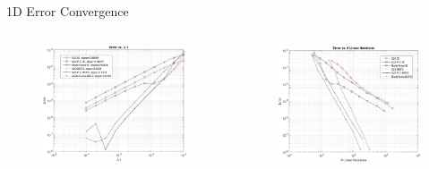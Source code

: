 \documentclass[8pt]{beamer}
\begin{document}
\begin{frame}{1D Error Convergence}

\begin{columns}
\begin{figure}[h]
\includegraphics[width=\linewidth]{figures/1D_dt.jpg}
\end{figure}
\begin{figure}[h]
\includegraphics[width=\linewidth]{figures/1D_lin.jpg}
\end{figure}
\end{columns}

\end{frame}
\end{document}
